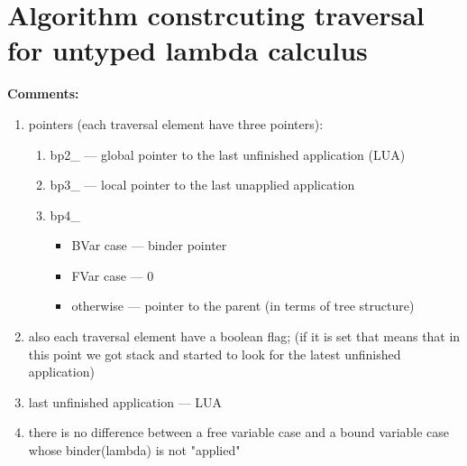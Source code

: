\documentclass[a4paper, 12pt]{article} %
\begin{document}
\section{Algorithm constrcuting traversal for untyped lambda calculus}
\textbf{Comments:}
\begin{enumerate}
\item pointers (each traversal element have three pointers):
  \begin{enumerate}
  \item bp2\_ --- global pointer to the last unfinished application (LUA)
  \item bp3\_ --- local pointer to the last unapplied application
  \item bp4\_
    \begin{itemize}
    \item BVar case --- binder pointer
    \item FVar case --- 0
    \item otherwise --- pointer to the parent (in terms of tree structure)
    \end{itemize}
  \end{enumerate}
\item also each traversal element have a boolean flag; (if it is set that means that in this point we got stack and started to look for the latest unfinished application)
\item last unfinished application --- LUA
\item there is no difference between a free variable case and a bound variable case whose binder(lambda) is not "applied"
\end{enumerate}
\end{document}
